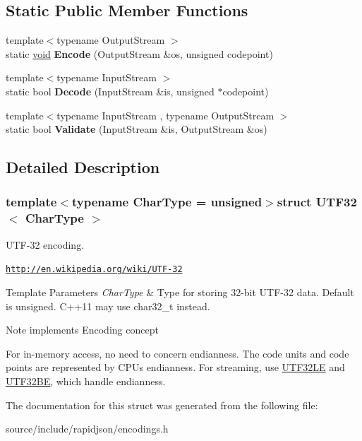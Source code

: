\subsection*{Static Public Member Functions}
\begin{DoxyCompactItemize}
\item 
\hypertarget{struct_u_t_f32_a511d1b09672ce535085895a28d8c2f13}{}{\footnotesize template$<$typename Output\+Stream $>$ }\\static \hyperlink{_s_d_l__audio_8h_a52835ae37c4bb905b903cbaf5d04b05f}{void} {\bfseries Encode} (Output\+Stream \&os, unsigned codepoint)\label{struct_u_t_f32_a511d1b09672ce535085895a28d8c2f13}

\item 
\hypertarget{struct_u_t_f32_a6e7258a5e982e101345dffdc355e9b53}{}{\footnotesize template$<$typename Input\+Stream $>$ }\\static bool {\bfseries Decode} (Input\+Stream \&is, unsigned $\ast$codepoint)\label{struct_u_t_f32_a6e7258a5e982e101345dffdc355e9b53}

\item 
\hypertarget{struct_u_t_f32_a71336fb0546b3079e01bbd51d2fa2e45}{}{\footnotesize template$<$typename Input\+Stream , typename Output\+Stream $>$ }\\static bool {\bfseries Validate} (Input\+Stream \&is, Output\+Stream \&os)\label{struct_u_t_f32_a71336fb0546b3079e01bbd51d2fa2e45}

\end{DoxyCompactItemize}


\subsection{Detailed Description}
\subsubsection*{template$<$typename Char\+Type = unsigned$>$struct U\+T\+F32$<$ Char\+Type $>$}

U\+T\+F-\/32 encoding. 

\href{http://en.wikipedia.org/wiki/UTF-32}{\tt http\+://en.\+wikipedia.\+org/wiki/\+U\+T\+F-\/32} 
\begin{DoxyTemplParams}{Template Parameters}
{\em Char\+Type} & Type for storing 32-\/bit U\+T\+F-\/32 data. Default is unsigned. C++11 may use char32\+\_\+t instead. \\
\hline
\end{DoxyTemplParams}
\begin{DoxyNote}{Note}
implements Encoding concept

For in-\/memory access, no need to concern endianness. The code units and code points are represented by C\+P\+U\textquotesingle{}s endianness. For streaming, use \hyperlink{struct_u_t_f32_l_e}{U\+T\+F32\+L\+E} and \hyperlink{struct_u_t_f32_b_e}{U\+T\+F32\+B\+E}, which handle endianness. 
\end{DoxyNote}


The documentation for this struct was generated from the following file\+:\begin{DoxyCompactItemize}
\item 
source/include/rapidjson/encodings.\+h\end{DoxyCompactItemize}
